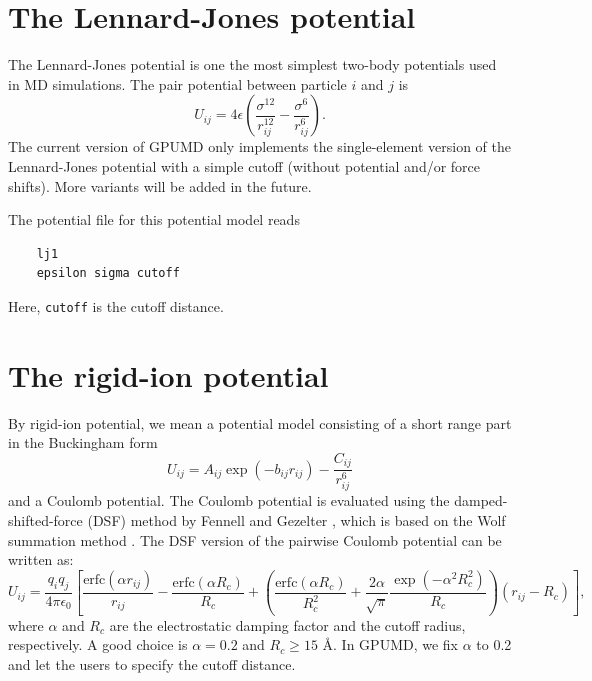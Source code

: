 \documentclass[12pt,a4paper]{report}
\begin{document}
\section{The Lennard-Jones potential}

The Lennard-Jones potential is one the most simplest two-body potentials used in MD simulations. The pair potential between particle $i$ and $j$ is
\begin{equation}
U_{ij} = 4 \epsilon
\left(
\frac{ \sigma^{12} }{ r_{ij}^{12} } -
\frac{\sigma^{6} }{ r_{ij}^{6} }
\right).
\end{equation}
The current version of GPUMD only implements the single-element version of the Lennard-Jones potential with a simple cutoff (without potential and/or force shifts). More variants will be added in the future.

The potential file for this potential model reads
\begin{verbatim}
    lj1
    epsilon sigma cutoff
\end{verbatim}
Here, \verb"cutoff" is the cutoff distance.

\section{The rigid-ion potential}

By rigid-ion potential, we mean a potential model consisting of a short range part in the Buckingham form
\begin{equation}
U_{ij} = A_{ij} \exp\left( - b_{ij} r_{ij} \right)
- \frac{C_{ij} }{ r_{ij}^{6} }
\end{equation}
and a Coulomb potential. The Coulomb potential is evaluated using the damped-shifted-force (DSF) method by Fennell and Gezelter \cite{fennell2006jcp}, which is based on the Wolf summation method \cite{wolf1999jcp}. The DSF version of the pairwise Coulomb potential can be written as:
\begin{equation}
U_{ij} = \frac{q_iq_j}{4\pi\epsilon_0}
\left[
\frac{\text{erfc}(\alpha r_{ij})}{r_{ij}} -
\frac{\text{erfc}(\alpha R_{c})}{R_{c}} +
  \left(
    \frac{\text{erfc}(\alpha R_{c})}{R_{c}^2} +
    \frac{2\alpha}{\sqrt{\pi}}
    \frac{\exp(-\alpha^2R_c^2)}{R_{c}}
  \right) (r_{ij} - R_c)
\right],
\end{equation}
where $\alpha$ and $R_c$ are the electrostatic damping factor and the cutoff radius, respectively.
A good choice is $\alpha=0.2$ and $R_c \geq 15$ \AA. In GPUMD, we fix $\alpha$  to 0.2 and let the users to specify the cutoff distance.
\end{document}
